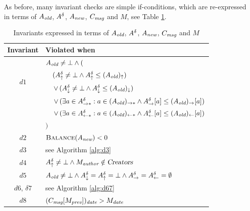 \documentclass{article}
\begin{document}
As before, many invariant checks are simple if-conditions, which are re-expressed in terms of $A_\emph{old}$, $A^\delta$, $A_\emph{new}$, $C_\emph{msg}$ and $M$, see Table \ref{tab:invariant-code-delta}.
\begin{table}[ht]
\begin{tabular}{|c|l|}
\hline
\textbf{Invariant} & \textbf{Violated when} \\
\hline
\multirow{4}{*}{$d1$} & $A_\emph{old} \ne \bot \land ($\\
    & $\quad (A^\delta_\uparrow \ne \bot \wedge A^\delta_\uparrow \leq (A_\emph{old})_\uparrow)$\\
    & $\quad \, \vee \,(A^\delta_\downarrow \ne \bot \wedge A^\delta_\downarrow \leq (A_\emph{old})_\downarrow)$\\
    & $\quad \, \vee \,(\exists a \in A^\delta_{\rightarrow*}: a \in (A_\emph{old})_{\rightarrow*} \wedge A^\delta_\rightarrow[a] \leq (A_\emph{old})_\rightarrow[a])$\\
    & $\quad \, \vee \,(\exists a \in A^\delta_{\leftarrow*} : a \in (A_\emph{old})_{\leftarrow*} \wedge A^\delta_\leftarrow[a] \leq (A_\emph{old})_\leftarrow[a])$\\
    &$)$\\
$d2$ & $\Call{Balance}{A_\emph{new}} < 0$\\
$d3$ & see Algorithm \ref{alg:d3}\\
$d4$ & $A^\delta_\uparrow \ne \bot \wedge M_\emph{author} \notin \textsl{Creators}$ \\
$d5$ & $A_\emph{old} \ne \bot \land A^\delta_\downarrow = A^\delta_\uparrow = \bot \wedge A^\delta_\rightarrow = A^\delta_\leftarrow = \emptyset$ \\
$d6$, $\delta7$ & see Algorithm \ref{alg:d67}\\
$d8$ & $(C_\emph{msg}[M_\emph{prev}])_\emph{date} > M_\emph{date}$\\
\hline
\end{tabular}
\caption{Invariants expressed in terms of $A_\emph{old}$, $A^\delta$, $A_\emph{new}$, $C_\emph{msg}$ and $M$}
\label{tab:invariant-code-delta}
\end{table}
\end{document}
